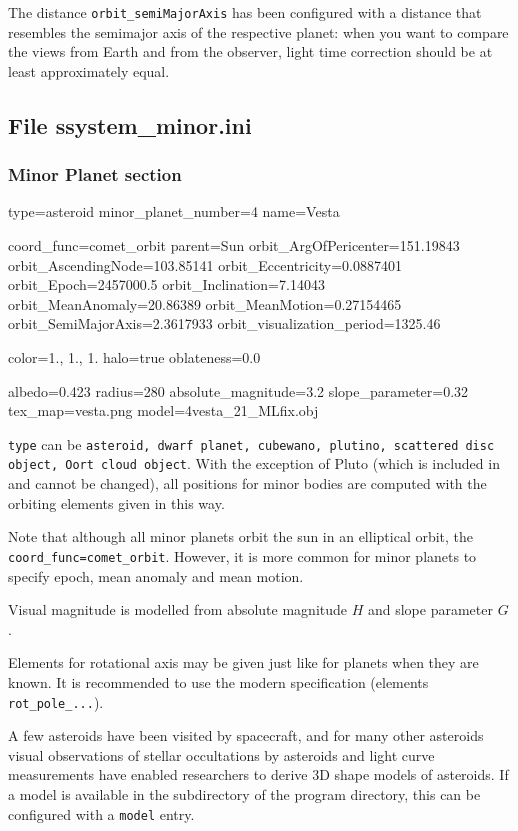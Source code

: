 The distance \texttt{orbit\_semiMajorAxis} has been configured with a
distance that resembles the semimajor axis of the respective planet:
when you want to compare the views from Earth and from the observer,
light time correction should be at least approximately equal.

\subsection{File ssystem\_minor.ini}
\label{sec:ssystem.ini:minor}

\subsubsection{Minor Planet section}
\label{sec:ssystem.ini:MinorPlanet}

\begin{configfile}
[4vesta]
type=asteroid  
minor_planet_number=4
name=Vesta

coord_func=comet_orbit
parent=Sun
orbit_ArgOfPericenter=151.19843
orbit_AscendingNode=103.85141
orbit_Eccentricity=0.0887401
orbit_Epoch=2457000.5
orbit_Inclination=7.14043
orbit_MeanAnomaly=20.86389
orbit_MeanMotion=0.27154465
orbit_SemiMajorAxis=2.3617933
orbit_visualization_period=1325.46

color=1., 1., 1.
halo=true
oblateness=0.0

albedo=0.423
radius=280
absolute_magnitude=3.2
slope_parameter=0.32
tex_map=vesta.png
model=4vesta_21_MLfix.obj
\end{configfile}

\texttt{type} can be \texttt{asteroid, dwarf planet, cubewano,
  plutino, scattered disc object, Oort cloud object}. With the
exception of Pluto (which is included in  and cannot be changed), 
all positions for minor bodies are computed with
the orbiting elements given in this way. 

Note that although all minor planets orbit the sun in an
elliptical orbit, the \texttt{coord\_func=comet\_orbit}. However, it
is more common for minor planets to specify epoch, mean anomaly and
mean motion.

Visual magnitude is modelled from absolute magnitude $H$ and slope parameter $G$.

Elements for rotational axis may be given just like for planets when
they are known. It is recommended to use the modern specification
(elements \texttt{rot\_pole\_...}).

A few asteroids have been visited by spacecraft, 
and for many other asteroids visual observations of stellar occultations 
by asteroids and light curve measurements have enabled researchers to derive 
3D shape models of asteroids. If a model is available in the  
subdirectory of the program directory, this can be configured with a \texttt{model} entry.

